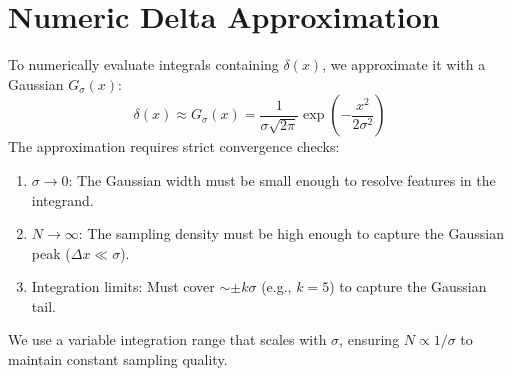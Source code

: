 \section{Numeric Delta Approximation}
\label{app:numeric_delta}
To numerically evaluate integrals containing $\delta(x)$, we approximate it with a Gaussian $G_{\sigma}(x)$:
\begin{equation}
    \delta(x) \approx G_{\sigma}(x) = \frac{1}{\sigma\sqrt{2\pi}} \exp\left(-\frac{x^{2}}{2\sigma^{2}}\right)
\end{equation}
The approximation requires strict convergence checks:
\begin{enumerate}
    \item $\sigma \to 0$: The Gaussian width must be small enough to resolve features in the integrand.
    \item $N \to \infty$: The sampling density must be high enough to capture the Gaussian peak ($\Delta x \ll \sigma$).
    \item Integration limits: Must cover $\sim \pm k\sigma$ (e.g., $k=5$) to capture the Gaussian tail.
\end{enumerate}
We use a variable integration range that scales with $\sigma$, ensuring $N \propto 1/\sigma$ to maintain constant sampling quality.
